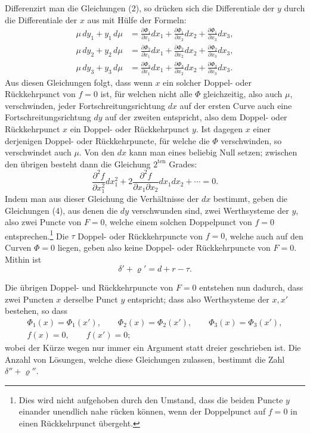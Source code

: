 \documentclass[10pt]{article}
\begin{document}
Differenzirt man die Gleichungen (2), so drücken sich die Differentiale der \(y\) durch die Differentiale der \(x\) aus mit Hülfe der Formeln:
\[
\tag{4}
\begin{aligned}
\mu\,dy_1+y_1\,d\mu
&=\frac{\partial\Phi_1}{\partial x_1}dx_1+
  \frac{\partial\Phi_1}{\partial x_2}dx_2+
  \frac{\partial\Phi_1}{\partial x_3}dx_3,\\
\mu\,dy_2+y_2\,d\mu
&=\frac{\partial\Phi_2}{\partial x_1}dx_1+
  \frac{\partial\Phi_2}{\partial x_2}dx_2+
  \frac{\partial\Phi_2}{\partial x_3}dx_3,\\
\mu\,dy_3+y_3\,d\mu
&=\frac{\partial\Phi_3}{\partial x_1}dx_1+
  \frac{\partial\Phi_3}{\partial x_2}dx_2+
  \frac{\partial\Phi_3}{\partial x_3}dx_3.
\end{aligned}
\]
Aus diesen Gleichungen folgt, dass wenn \(x\) ein solcher Doppel- oder Rückkehrpunct von \(f=0\) ist, für welchen nicht alle \(\Phi\) gleichzeitig, also auch \(\mu\), verschwinden, jeder Fortschreitungsrichtung \(dx\) auf der ersten Curve auch eine Fortschreitungsrichtung \(dy\) auf der zweiten entspricht, also dem Doppel- oder Rückkehrpunct \(x\) ein Doppel- oder Rückkehrpunct \(y\). Ist dagegen \(x\) einer derjenigen Doppel- oder Rückkehrpuncte, für welche die \(\Phi\) verschwinden, so verschwindet auch \(\mu\). Von den \(dx\) kann man eines beliebig Null setzen; zwischen den übrigen besteht dann die Gleichung \(2^{\text{ten}}\) Grades:
\[
\frac{\partial^2 f}{\partial x_1^2}dx_1^2
+2\frac{\partial^2 f}{\partial x_1\partial x_2}dx_1dx_2+\cdots=0.
\]
Indem man aus dieser Gleichung die Verhältnisse der \(dx\) bestimmt, geben die Gleichungen (4), aus denen die \(dy\) verschwunden sind, zwei Werthsysteme der \(y\), also zwei Puncte von \(F=0\), welche einem solchen Doppelpunct von \(f=0\) entsprechen.\footnote{Dies wird nicht aufgehoben durch den Umstand, dass die beiden Puncte \(y\) einander unendlich nahe rücken können, wenn der Doppelpunct auf \(f=0\) in einen Rückkehrpunct übergeht.} Die \(\tau\) Doppel- oder Rückkehrpuncte von \(f=0\), welche auch auf den Curven \(\Phi=0\) liegen, geben also keine Doppel- oder Rückkehrpuncte von \(F=0\). Mithin ist
\[
\delta'+\varrho'=d+r-\tau.
\]

Die übrigen Doppel- und Rückkehrpuncte von \(F=0\) entstehen nun dadurch, dass zwei Puncten \(x\) derselbe Punct \(y\) entspricht; dass also Werthsysteme der \(x,x'\) bestehen, so dass
\[
\tag{5}
\begin{gathered}
\Phi_1(x)=\Phi_1(x'),\qquad
\Phi_2(x)=\Phi_2(x'),\qquad
\Phi_3(x)=\Phi_3(x'),\\
f(x)=0,\qquad f(x')=0;
\end{gathered}
\]
wobei der Kürze wegen nur immer ein Argument statt dreier geschrieben ist. Die Anzahl von Lösungen, welche diese Gleichungen zulassen, bestimmt die Zahl \(\delta''+\varrho''\).
\end{document}
